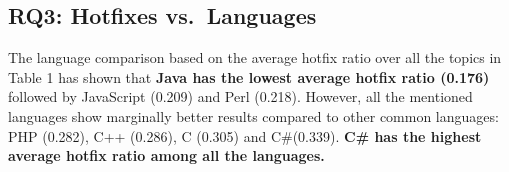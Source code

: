 \documentclass{sig-alternate}
\begin{document}



\subsection{RQ3: Hotfixes vs.\ Languages}
The language comparison based on the average hotfix ratio over all the topics in Table 1 has shown that \textbf{Java has the lowest average hotfix ratio (0.176)} followed by JavaScript (0.209) and Perl (0.218). However, all the mentioned languages show marginally better results compared to other common languages: PHP (0.282), C++ (0.286), C (0.305) and C\#(0.339). \textbf{C\# has the highest average hotfix ratio among all the languages.}
\end{document}
